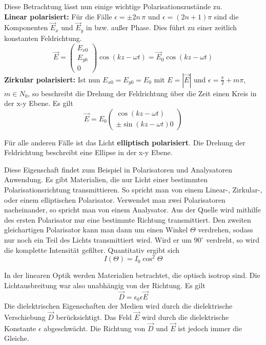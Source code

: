 Diese Betrachtung lässt nun einige wichtige Polarisationszustände zu.\\
\textbf{Linear polarisiert:} Für die Fälle $\epsilon = \pm 2n \, \pi$ und
$\epsilon = (2n+1) \pi$ sind die Komponenten $\vec{E}_x$ und $\vec{E}_y$ in bzw.
außer Phase. Dies führt zu einer zeitlich konstanten Feldrichtung.
\[
    \vec{E} = 
      \begin{pmatrix}
          E_{x0}\\
          E_{y0}\\
          0
      \end{pmatrix}
    \cos (kz-\omega t) = \vec{E}_0 \cos (kz-\omega t)
\]
\textbf{Zirkular polarisiert:} Ist nun $E_{x0} = E_{y0} = E_0$ mit 
$E = | \vec{E} |$ und $\epsilon = \frac{\pi}{2} + m \pi$, $m \in N_0$, so beschreibt
die Drehung der Feldrichtung über die Zeit einen Kreis in der x-y Ebene. Es gilt
\[
    \vec{E} = E_0
        \begin{pmatrix}
            \cos(kz-\omega t)\\
            \pm \sin(kz-\omega t)
            0
        \end{pmatrix}
\]

Für alle anderen Fälle ist das Licht \textbf{elliptisch polarisiert}. Die 
Drehung der Feldrichtung beschreibt eine Ellipse in der x-y Ebene.

Diese Eigenschaft findet zum Beispiel in Polarisatoren und Analysatoren Anwendung.
Es gibt Materialien, die nur Licht einer bestimmten Polarisationsrichtung
transmittieren. So spricht man von einem Linear-, Zirkular-, oder einem elliptischen
Polarisator. Verwendet man zwei Polarisatoren nacheinander, so spricht man von 
einem Analysator.
Aus der Quelle wird mithilfe des ersten Polarisator nur eine bestimmte
Richtung transmittiert. Den zweiten gleichartigen Polarisator kann man 
dann um einen Winkel $\Theta$ verdrehen, sodass nur noch ein Teil des Lichts
transmittiert wird. Wird er um $90^\circ$ verdreht, so wird die komplette
Intensität gefilter. Quantitativ ergibt sich
\[
    I(\Theta) = I_0 \cos^2 \Theta
\]

In der linearen Optik werden Materialien betrachtet, die optisch isotrop sind.
Die Lichtausbreitung war also unabhängig von der Richtung. Es gilt
\[
    \vec{D} = \epsilon_0 \epsilon \vec{E}
\]
Die dielektrischen Eigenschaften der Medien wird durch die dielektrische
Verschiebung $\vec{D}$ berücksichtigt. Das Feld $\vec{E}$ wird durch
die dielektrische Konstante $\epsilon$ abgeschwächt. Die Richtung von 
$\vec{D}$ und $\vec{E}$ ist jedoch immer die Gleiche. 

